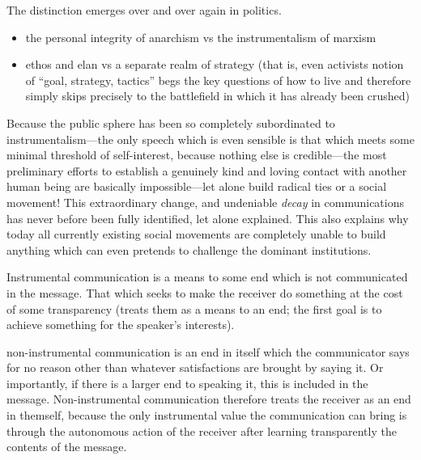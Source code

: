 \documentclass[12pt,book]{article}
\begin{document}
The distinction emerges over and over again in politics.

\begin{itemize}
\item
  the personal integrity of anarchism vs the instrumentalism of marxism
\item
  ethos and elan vs a separate realm of strategy (that is, even
  activists notion of ``goal, strategy, tactics'' begs the key questions
  of how to live and therefore simply skips precisely to the battlefield
  in which it has already been crushed)
\end{itemize}

Because the public sphere has been so completely subordinated to
instrumentalism---the only speech which is even sensible is that which
meets some minimal threshold of self-interest, because nothing else is
credible---the most preliminary efforts to establish a genuinely kind
and loving contact with another human being are basically
impossible---let alone build radical ties or a social movement! This
extraordinary change, and undeniable \emph{decay} in communications has
never before been fully identified, let alone explained. This also
explains why today all currently existing social movements are
completely unable to build anything which can even pretends to challenge
the dominant institutions.

Instrumental communication is a means to some end which is not
communicated in the message. That which seeks to make the receiver do
something at the cost of some transparency (treats them as a means to an
end; the first goal is to achieve something for the speaker's
interests).

non-instrumental communication is an end in itself which the
communicator says for no reason other than whatever satisfactions are
brought by saying it. Or importantly, if there is a larger end to
speaking it, this is included in the message. Non-instrumental
communication therefore treats the receiver as an end in themself,
because the only instrumental value the communication can bring is
through the autonomous action of the receiver after learning
transparently the contents of the message.
\end{document}
